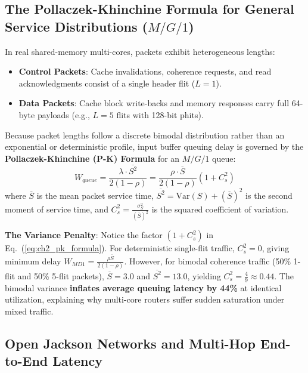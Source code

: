 \subsection{The Pollaczek-Khinchine Formula for General Service Distributions ($M/G/1$)}
\label{subsec:ch2_mg1}

In real shared-memory multi-cores, packets exhibit heterogeneous lengths:
\begin{itemize}
    \item \textbf{Control Packets}: Cache invalidations, coherence requests, and read acknowledgments consist of a single header flit ($L = 1$).
    \item \textbf{Data Packets}: Cache block write-backs and memory responses carry full 64-byte payloads (e.g., $L = 5$ flits with 128-bit phits).
\end{itemize}

Because packet lengths follow a discrete bimodal distribution rather than an exponential or deterministic profile, input buffer queuing delay is governed by the \textbf{Pollaczek-Khinchine (P-K) Formula} for an $M/G/1$ queue:
\begin{equation}
W_{queue} = \frac{\lambda \cdot \overline{S^2}}{2(1 - \rho)} = \frac{\rho \cdot \overline{S}}{2(1 - \rho)} \left(1 + C_s^2\right)
\label{eq:ch2_pk_formula}
\end{equation}
where $\overline{S}$ is the mean packet service time, $\overline{S^2} = \text{Var}(S) + (\overline{S})^2$ is the second moment of service time, and $C_s^2 = \frac{\sigma_S^2}{(\overline{S})^2}$ is the squared coefficient of variation.

\begin{svgraybox}
\textbf{The Variance Penalty}: Notice the factor $(1 + C_s^2)$ in Eq.~(\ref{eq:ch2_pk_formula}). For deterministic single-flit traffic, $C_s^2 = 0$, giving minimum delay $W_{MD1} = \frac{\rho \overline{S}}{2(1 - \rho)}$. However, for bimodal coherence traffic (50\% 1-flit and 50\% 5-flit packets), $\overline{S} = 3.0$ and $\overline{S^2} = 13.0$, yielding $C_s^2 = \frac{4}{9} \approx 0.44$. The bimodal variance \textbf{inflates average queuing latency by 44\%} at identical utilization, explaining why multi-core routers suffer sudden saturation under mixed traffic.
\end{svgraybox}

\subsection{Open Jackson Networks and Multi-Hop End-to-End Latency}
\label{subsec:ch2_jackson}

